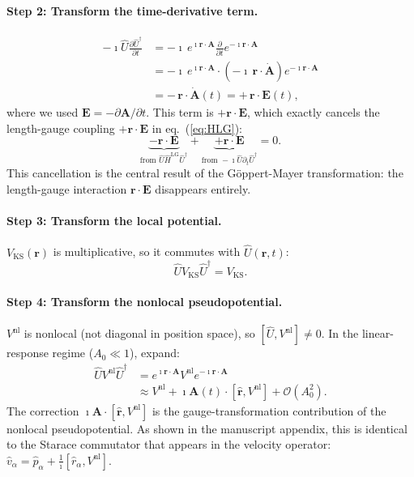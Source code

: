 \documentclass[11pt]{article}
\newcommand{\iunit}{\imath}          %
\newcommand{\Avec}{\mathbf{A}}
\newcommand{\Vnl}{V^{\mathrm{nl}}}
\newcommand{\HLG}{\hat{H}^{\mathrm{LG}}}
\begin{document}
\paragraph{Step 2: Transform the time-derivative term.}
\begin{align}
  -\iunit\hat{U}\frac{\partial\hat{U}^\dagger}{\partial t}
  &= -\iunit\,e^{\iunit\mathbf{r}\cdot\Avec}
     \frac{\partial}{\partial t}
     e^{-\iunit\mathbf{r}\cdot\Avec}
  \nonumber\\
  &= -\iunit\,e^{\iunit\mathbf{r}\cdot\Avec}
     \cdot(-\iunit\,\mathbf{r}\cdot\dot{\Avec})
     e^{-\iunit\mathbf{r}\cdot\Avec}
  \nonumber\\
  &= -\,\mathbf{r}\cdot\dot{\Avec}(t)
  = +\,\mathbf{r}\cdot\mathbf{E}(t),
  \label{eq:dt-term}
\end{align}
where we used $\mathbf{E} = -\partial\Avec/\partial t$.
This term is $+\mathbf{r}\cdot\mathbf{E}$, which exactly cancels
the length-gauge coupling $+\mathbf{r}\cdot\mathbf{E}$ in
eq.~(\ref{eq:HLG}):
\begin{equation}
  \underbrace{-\mathbf{r}\cdot\mathbf{E}}_{\text{from }\hat{U}\HLG\hat{U}^\dagger}
  + \underbrace{+\mathbf{r}\cdot\mathbf{E}}_{\text{from }-\iunit\hat{U}\partial_t\hat{U}^\dagger}
  = 0.
  \label{eq:LG-coupling-cancels}
\end{equation}
This cancellation is the central result of the Göppert-Mayer
transformation: the length-gauge interaction $\mathbf{r}\cdot\mathbf{E}$
disappears entirely.

\paragraph{Step 3: Transform the local potential.}
$V_\mathrm{KS}(\mathbf{r})$ is multiplicative, so it commutes with
$\hat{U}(\mathbf{r},t)$:
\begin{equation}
  \hat{U}V_\mathrm{KS}\hat{U}^\dagger = V_\mathrm{KS}.
  \label{eq:VKS-invariant}
\end{equation}

\paragraph{Step 4: Transform the nonlocal pseudopotential.}
$\Vnl$ is nonlocal (not diagonal in position space), so
$[\hat{U},\Vnl]\neq0$.
In the linear-response regime ($A_0\ll 1$), expand:
\begin{align}
  \hat{U}\Vnl\hat{U}^\dagger
  &= e^{\iunit\mathbf{r}\cdot\Avec}\Vnl e^{-\iunit\mathbf{r}\cdot\Avec}
  \nonumber\\
  &\approx \Vnl
  + \iunit\Avec(t)\cdot[\hat{\mathbf{r}},\Vnl]
  + \mathcal{O}(A_0^2).
  \label{eq:VNL-transform}
\end{align}
The correction $\iunit\Avec\cdot[\hat{\mathbf{r}},\Vnl]$ is the
gauge-transformation contribution of the nonlocal pseudopotential.
As shown in the manuscript appendix, this is identical to the
Starace commutator that appears in the velocity operator:
$\hat{v}_\alpha = \hat{p}_\alpha + \frac{1}{\iunit}[\hat{r}_\alpha,\Vnl]$.
\end{document}
